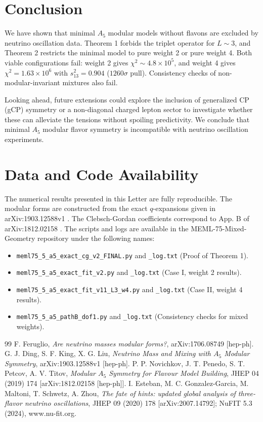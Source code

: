 \documentclass[11pt, a4paper]{article}
\begin{document}
\section{Conclusion}
We have shown that minimal \(A_5\) modular models without flavons are excluded by neutrino oscillation data. Theorem 1 forbids the triplet operator for \(L\sim 3\), and Theorem 2 restricts the minimal model to pure weight 2 or pure weight 4. Both viable configurations fail: weight 2 gives \(\chi^2 \sim 4.8\times 10^5\), and weight 4 gives \(\chi^2 = 1.63 \times 10^6\) with \(s_{13}^2 = 0.904\) (\(1260\sigma\) pull). Consistency checks of non-modular-invariant mixtures also fail. 

Looking ahead, future extensions could explore the inclusion of generalized CP (gCP) symmetry or a non-diagonal charged lepton sector to investigate whether these can alleviate the tensions without spoiling predictivity. We conclude that minimal \(A_5\) modular flavor symmetry is incompatible with neutrino oscillation experiments.

\section*{Data and Code Availability}
The numerical results presented in this Letter are fully reproducible. The modular forms are constructed from the exact \(q\)-expansions given in arXiv:1903.12588v1 \cite{Ding:2019}. The Clebsch-Gordan coefficients correspond to App. B of arXiv:1812.02158 \cite{Novichkov:2018}. 
The scripts and logs are available in the MEML-75-Mixed-Geometry repository under the following names:
\begin{itemize}
    \item \texttt{meml75\_5\_a5\_exact\_cg\_v2\_FINAL.py} and \texttt{\_log.txt} (Proof of Theorem 1).
    \item \texttt{meml75\_5\_a5\_exact\_fit\_v2.py} and \texttt{\_log.txt} (Case I, weight 2 results).
    \item \texttt{meml75\_5\_a5\_exact\_fit\_v11\_L3\_w4.py} and \texttt{\_log.txt} (Case II, weight 4 results).
    \item \texttt{meml75\_5\_a5\_pathB\_dof1.py} and \texttt{\_log.txt} (Consistency checks for mixed weights).
\end{itemize}

\begin{thebibliography}{99}
 F. Feruglio, \textit{Are neutrino masses modular forms?}, arXiv:1706.08749 [hep-ph].
 G. J. Ding, S. F. King, X. G. Liu, \textit{Neutrino Mass and Mixing with \(A_5\) Modular Symmetry}, arXiv:1903.12588v1 [hep-ph].
 P. P. Novichkov, J. T. Penedo, S. T. Petcov, A. V. Titov, \textit{Modular \(A_5\) Symmetry for Flavour Model Building}, JHEP 04 (2019) 174 [arXiv:1812.02158 [hep-ph]].
 I. Esteban, M. C. Gonzalez-Garcia, M. Maltoni, T. Schwetz, A. Zhou, \textit{The fate of hints: updated global analysis of three-flavor neutrino oscillations}, JHEP 09 (2020) 178 [arXiv:2007.14792]; NuFIT 5.3 (2024), www.nu-fit.org.
\end{thebibliography}
\end{document}

